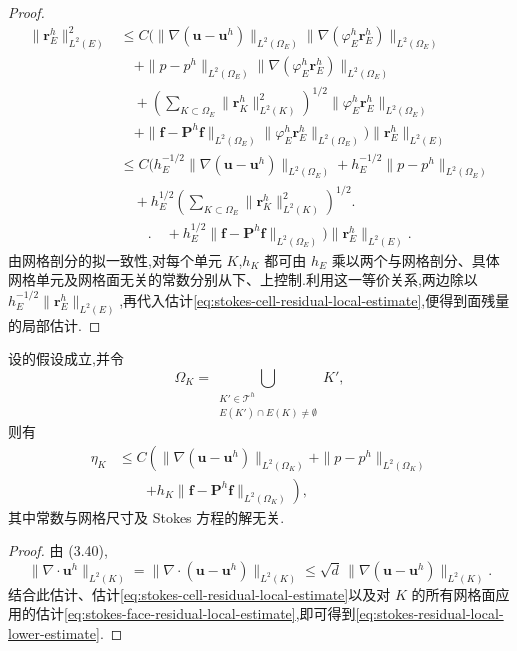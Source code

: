 \begin{proof}
{\[\begin{aligned}
 \|\bm{r}_E^h\|_{L^2(E)}^2
 &\leq C\Biggl(
   \|\nabla(\bm{u}-\bm{u}^h)\|_{L^2(\Omega_E)}
      \|\nabla(\varphi_E^h\bm{r}_E^h)\|_{L^2(\Omega_E)}\\
 &\quad+\|p-p^h\|_{L^2(\Omega_E)}
      \|\nabla(\varphi_E^h\bm{r}_E^h)\|_{L^2(\Omega_E)}\\
 &\quad+\left(\sum_{K\subset\Omega_E}
        \|\bm{r}_K^h\|_{L^2(K)}^2\right)^{1/2}
       \|\varphi_E^h\bm{r}_E^h\|_{L^2(\Omega_E)}\\
 &\quad+\|\bm{f}-\bm{P}^h\bm{f}\|_{L^2(\Omega_E)}
       \|\varphi_E^h\bm{r}_E^h\|_{L^2(\Omega_E)}
 \Biggr)\|\bm{r}_E^h\|_{L^2(E)}\\
  &\leq C\Biggl(
    h_E^{-1/2}\|\nabla(\bm{u}-\bm{u}^h)\|_{L^2(\Omega_E)}
    +h_E^{-1/2}\|p-p^h\|_{L^2(\Omega_E)}\\
  &\quad+h_E^{1/2}\left(\sum_{K\subset\Omega_E}
         \|\bm{r}_K^h\|_{L^2(K)}^2\right)^{1/2}\Biggr.\\
  &\qquad\Biggl.\quad+h_E^{1/2}\|\bm{f}-\bm{P}^h\bm{f}\|_{L^2(\Omega_E)}
  \Biggr)\|\bm{r}_E^h\|_{L^2(E)}.
\end{aligned}
\]
}
由网格剖分的拟一致性,对每个单元 $K$,$h_K$ 都可由 $h_E$ 乘以两个与网格剖分、具体网格单元及网格面无关的常数分别从下、上控制.利用这一等价关系,两边除以 $h_E^{-1/2}\|\bm{r}_E^h\|_{L^2(E)}$,再代入估计\cref{eq:stokes-cell-residual-local-estimate},便得到面残量的局部估计.
\end{proof}

\begin{theorem}\label{thm:stokes-residual-local-lower-estimate}
设的假设成立,并令
\[
 \Omega_K=
 \bigcup_{\substack{K'\in\mathcal{T}^h\\
          E(K')\cap E(K)\ne\emptyset}}K',
\]
则有
\begingroup\small
\begin{equation}\label{eq:stokes-residual-local-lower-estimate}
\begin{aligned}
 \eta_K
 &\leq C\left(
   \|\nabla(\bm{u}-\bm{u}^h)\|_{L^2(\Omega_K)}
   +\|p-p^h\|_{L^2(\Omega_K)}\right.\\
 &\qquad\left.
   +h_K\|\bm{f}-\bm{P}^h\bm{f}\|_{L^2(\Omega_K)}
 \right),
\end{aligned}
\end{equation}
\endgroup
其中常数与网格尺寸及 Stokes 方程的解无关.
\end{theorem}
\begin{proof}
由 (3.40),
\[
 \|\nabla\cdot\bm{u}^h\|_{L^2(K)}
 =\|\nabla\cdot(\bm{u}-\bm{u}^h)\|_{L^2(K)}
 \leq \sqrt d\,
       \|\nabla(\bm{u}-\bm{u}^h)\|_{L^2(K)}.
\]
结合此估计、估计\cref{eq:stokes-cell-residual-local-estimate}以及对 $K$ 的所有网格面应用的估计\cref{eq:stokes-face-residual-local-estimate},即可得到\cref{eq:stokes-residual-local-lower-estimate}.
\end{proof}

